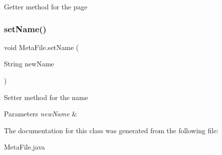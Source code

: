 Getter method for the page \mbox{\label{class_meta_file_ac4abf81a1fb0c5478b13527091345ed5}} 
\subsubsection{\texorpdfstring{set\+Name()}{setName()}}
{\footnotesize\ttfamily void Meta\+File.\+set\+Name (\begin{DoxyParamCaption}\item[{String}]{new\+Name }\end{DoxyParamCaption})\hspace{0.3cm}{\ttfamily [inline]}}

Setter method for the name 
\begin{DoxyParams}{Parameters}
{\em new\+Name} & \\
\hline
\end{DoxyParams}


The documentation for this class was generated from the following file\+:\begin{DoxyCompactItemize}
\item 
Meta\+File.\+java\end{DoxyCompactItemize}
